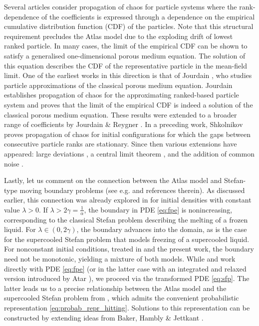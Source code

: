 \documentclass[11pt, a4paper]{article}
\theoremstyle{plain}
\theoremstyle{definition}
\theoremstyle{remark}
\numberwithin{equation}{section}
\begin{document}
Several articles consider propagation of chaos for particle systems where the rank-dependence of the coefficients is expressed through a dependence on the empirical cumulative distribution function (CDF) of the particles. Note that this structural requirement precludes the Atlas model due to the exploding drift of lowest ranked particle. In many cases, the limit of the empirical CDF can be shown to satisfy a generalised one-dimensional porous medium equation. The solution of this equation describes the CDF of the representative particle in the mean-field limit. One of the earliest works in this direction is that of Jourdain \cite{jourdain_pme_2000}, who studies particle approximations of the classical porous medium equation. Jourdain establishes propagation of chaos for the approximating ranked-based particle system and proves that the limit of the empirical CDF is indeed a solution of the classical porous medium equation. These results were extended to a broader range of coefficients by Jourdain \& Reygner \cite{jourdain_poc_rank_2013}. In a preceding work, Shkolnikov \cite{shkolnikov_ranked_based_2012} proves propagation of chaos for initial configurations for which the gaps between consecutive particle ranks are stationary. Since then various extensions have appeared: large deviations \cite{dembo_ranked_ld_2016}, a central limit theorem \cite{kolli_clt_rank_2018}, and the addition of common noise \cite{kolli_ranked_common_2019, shkolnikov_rank_2024}.

Lastly, let us comment on the connection between the Atlas model and Stefan-type moving boundary problems (see e.g.\@ \cite{cannon_sp_1970, sherman_sp_1970, fasano_fbp_1977, chayes_hdl_1996} and references therein). As discussed earlier, this connection was already explored in \cite{cabezas_rank_2019} for initial densities with constant value $\lambda > 0$. If $\lambda > 2\gamma = \frac{1}{\alpha}$, the boundary in PDE \eqref{eq:fpe} is nonincreasing, corresponding to the classical Stefan problem describing the melting of a frozen liquid. For $\lambda \in (0, 2\gamma)$, the boundary advances into the domain, as is the case for the supercooled Stefan problem that models freezing of a supercooled liquid. For nonconstant initial conditions, treated in \cite{atar_atlas_2025} and the present work, the boundary need not be monotonic, yielding a mixture of both models. While \cite{cabezas_rank_2019} and \cite{atar_atlas_2025} work directly with PDE \eqref{eq:fpe} (or in the latter case with an integrated and relaxed version introduced by Atar \cite{atar_weak_fbp_2025}), we proceed via the transformed PDE \eqref{eq:sfp}. The latter leads us to a precise relationship between the Atlas model and the supercooled Stefan problem from \cite{hambly_mckean_2019, nadtochiy_mean_field_2020}, which admits the convenient probabilistic representation \eqref{eq:probab_repr_hitting}. Solutions to this representation can be constructed by extending ideas from Baker, Hambly \& Jettkant \cite{baker_loc_times_2025}.
\end{document}
